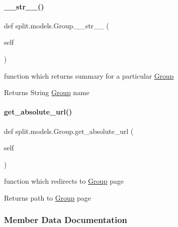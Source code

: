 \paragraph{\texorpdfstring{\+\_\+\+\_\+str\+\_\+\+\_\+()}{\_\_str\_\_()}}
{\footnotesize\ttfamily def split.\+models.\+Group.\+\_\+\+\_\+str\+\_\+\+\_\+ (\begin{DoxyParamCaption}\item[{}]{self }\end{DoxyParamCaption})}



function which returns summary for a particular \hyperlink{classsplit_1_1models_1_1Group}{Group} 

\begin{DoxyReturn}{Returns}
String \hyperlink{classsplit_1_1models_1_1Group}{Group} name 
\end{DoxyReturn}
\mbox{\label{classsplit_1_1models_1_1Group_a8bf6efa6c71f8386d6cd47ee6b46b78e}} 
\paragraph{\texorpdfstring{get\+\_\+absolute\+\_\+url()}{get\_absolute\_url()}}
{\footnotesize\ttfamily def split.\+models.\+Group.\+get\+\_\+absolute\+\_\+url (\begin{DoxyParamCaption}\item[{}]{self }\end{DoxyParamCaption})}



function which redirects to \hyperlink{classsplit_1_1models_1_1Group}{Group} page 

\begin{DoxyReturn}{Returns}
path to \hyperlink{classsplit_1_1models_1_1Group}{Group} page 
\end{DoxyReturn}


\subsubsection{Member Data Documentation}
\mbox{\label{classsplit_1_1models_1_1Group_ab9568485e4656ffbca69cd5892bd41a7}} 
